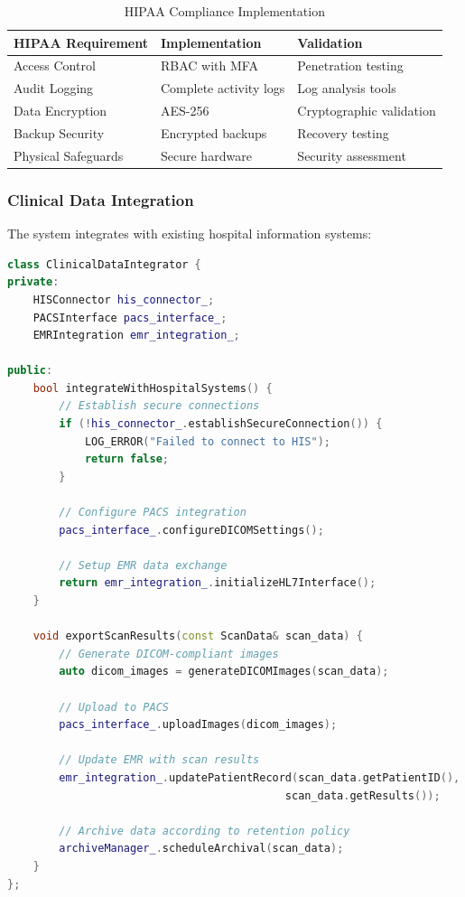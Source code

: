 \begin{table}[htbp]
\centering
\caption{HIPAA Compliance Implementation}
\label{tab:hipaa-compliance}
\begin{tabular}{|l|l|l|}
\hline
\textbf{HIPAA Requirement} & \textbf{Implementation} & \textbf{Validation} \\
\hline
Access Control & RBAC with MFA & Penetration testing \\
Audit Logging & Complete activity logs & Log analysis tools \\
Data Encryption & AES-256 & Cryptographic validation \\
Backup Security & Encrypted backups & Recovery testing \\
Physical Safeguards & Secure hardware & Security assessment \\
\hline
\end{tabular}
\end{table}

\subsubsection{Clinical Data Integration}
The system integrates with existing hospital information systems:

\begin{lstlisting}[language=C++, caption={Clinical Data Integration}, label={lst:clinical-data}]
class ClinicalDataIntegrator {
private:
    HISConnector his_connector_;
    PACSInterface pacs_interface_;
    EMRIntegration emr_integration_;
    
public:
    bool integrateWithHospitalSystems() {
        // Establish secure connections
        if (!his_connector_.establishSecureConnection()) {
            LOG_ERROR("Failed to connect to HIS");
            return false;
        }
        
        // Configure PACS integration
        pacs_interface_.configureDICOMSettings();
        
        // Setup EMR data exchange
        return emr_integration_.initializeHL7Interface();
    }
    
    void exportScanResults(const ScanData& scan_data) {
        // Generate DICOM-compliant images
        auto dicom_images = generateDICOMImages(scan_data);
        
        // Upload to PACS
        pacs_interface_.uploadImages(dicom_images);
        
        // Update EMR with scan results
        emr_integration_.updatePatientRecord(scan_data.getPatientID(), 
                                           scan_data.getResults());
        
        // Archive data according to retention policy
        archiveManager_.scheduleArchival(scan_data);
    }
};
\end{lstlisting}

